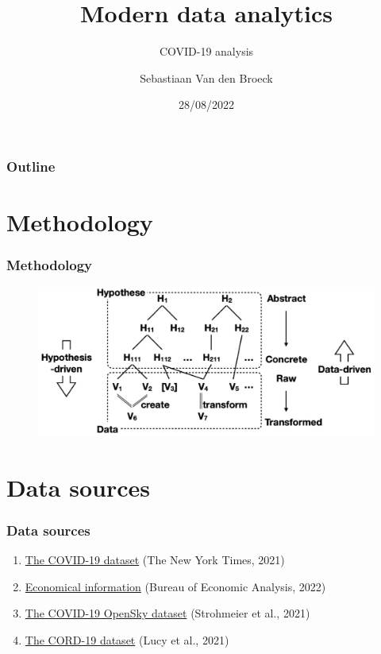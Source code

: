 \documentclass{beamer}
\title{Modern data analytics}
\subtitle{COVID-19 analysis}
\author{Sebastiaan Van den Broeck}
\institute{KUL}
\date{28/08/2022}
\begin{document}
\begin{frame}
\titlepage
\end{frame}

\begin{frame}
\frametitle{Outline}
\tableofcontents
\end{frame}

\section{Methodology}
\begin{frame}
\frametitle{Methodology}

\begin{figure}
\centering
\includegraphics[width=0.8\linewidth]{../visualizations/hypothesis_space_data_space.png}
\end{figure}

\end{frame}

\section{Data sources}
\begin{frame}
\frametitle{Data sources}

\begin{enumerate}
\item \href{https://github.com/nytimes/covid-19-data}{The COVID-19 dataset} \hfill (The New York Times, 2021)
\item \href{https://apps.bea.gov/regional/downloadzip.cfm}{Economical information} \hfill (Bureau of Economic Analysis, 2022)
\item \href{https://zenodo.org/record/6411336\#.YvUG14VBzCl}{The COVID-19 OpenSky dataset} \hfill (Strohmeier et al., 2021)
\item \href{https://github.com/allenai/cord19}{The CORD-19 dataset} \hfill (Lucy et al., 2021)
\end{enumerate}

\end{frame}
\end{document}

